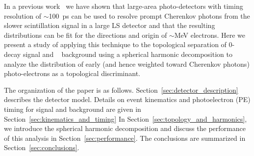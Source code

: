  In a previous work~\cite{Aberle2014} we have shown that large-area
photo-detectors with timing resolution of $\sim$100~ps can be used to
resolve prompt Cherenkov photons from the slower scintillation signal
in a large LS detector and that the resulting distributions can be fit for
the directions and origin of $\sim$MeV electrons. Here we present a
study of applying this technique to the topological separation of
0\nbb-decay signal and \B~ background using a spherical harmonic
decomposition to analyze the distribution of early (and hence weighted
toward Cherenkov photons) photo-electrons as a topological
discriminant.

The organization of the paper is as follows. 
Section~\ref{sec:detector_description} describes
the detector model. Details on event
kinematics and photoelectron (PE) timing for signal and background are given in
Section~\ref{sec:kinematics_and_timing} In
Section~\ref{sec:topology_and_harmonics}, we introduce the spherical
harmonic decomposition and discuss the performance of this analysis
in Section~\ref{sec:performance}. The conclusions are summarized in Section~\ref{sec:conclusions}.




  

